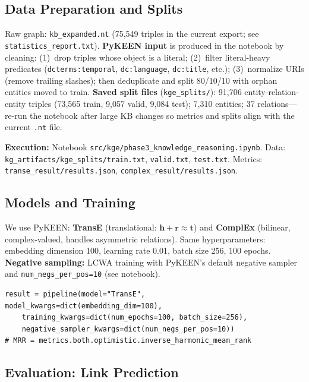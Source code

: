 \documentclass[11pt,a4paper]{article}
\begin{document}
\subsection{Data Preparation and Splits}

Raw graph: \texttt{kb\_expanded.nt} (75,549 triples in the current export; see \texttt{statistics\_report.txt}). \textbf{PyKEEN input} is produced in the notebook by cleaning: (1)~drop triples whose object is a literal; (2)~filter literal-heavy predicates (\texttt{dcterms:temporal}, \texttt{dc:language}, \texttt{dc:title}, etc.); (3)~normalize URIs (remove trailing slashes); then deduplicate and split 80/10/10 with orphan entities moved to train. \textbf{Saved split files} (\texttt{kge\_splits/}): 91,706 entity-relation-entity triples (73,565 train, 9,057 valid, 9,084 test); 7,310 entities; 37 relations---re-run the notebook after large KB changes so metrics and splits align with the current \texttt{.nt} file.

\textbf{Execution:} Notebook \texttt{src/kge/phase3\_knowledge\_reasoning.ipynb}. Data: \texttt{kg\_artifacts/kge\_splits/train.txt}, \texttt{valid.txt}, \texttt{test.txt}. Metrics: \texttt{transe\_result/results.json}, \texttt{complex\_result/results.json}.

\subsection{Models and Training}

We use PyKEEN: \textbf{TransE} (translational: $\mathbf{h}+\mathbf{r}\approx\mathbf{t}$) and \textbf{ComplEx} (bilinear, complex-valued, handles asymmetric relations). Same hyperparameters: embedding dimension 100, learning rate 0.01, batch size 256, 100 epochs. \textbf{Negative sampling:} LCWA training with PyKEEN's default negative sampler and \texttt{num\_negs\_per\_pos=10} (see notebook).

\begin{lstlisting}[caption={\texttt{src/kge/phase3\_knowledge\_reasoning.ipynb} -- TransE and ComplEx training (PyKEEN)}]
result = pipeline(model="TransE", model_kwargs=dict(embedding_dim=100),
    training_kwargs=dict(num_epochs=100, batch_size=256),
    negative_sampler_kwargs=dict(num_negs_per_pos=10))
# MRR = metrics.both.optimistic.inverse_harmonic_mean_rank
\end{lstlisting}

\subsection{Evaluation: Link Prediction}
\end{document}
